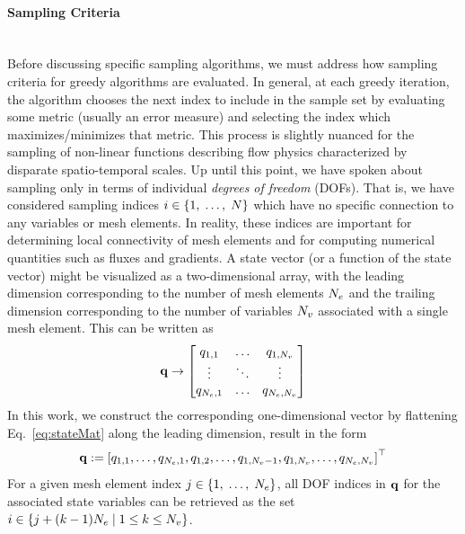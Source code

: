 \paragraph*{Sampling Criteria}\mbox{}\\
%
Before discussing specific sampling algorithms, we must address how sampling criteria for greedy algorithms are evaluated. In general, at each greedy iteration, the algorithm chooses the next index to include in the sample set by evaluating some metric (usually an error measure) and selecting the index which maximizes/minimizes that metric. This process is slightly nuanced for the sampling of non-linear functions describing flow physics characterized by disparate spatio-temporal scales. Up until this point, we have spoken about sampling only in terms of individual \textit{degrees of freedom} (DOFs). That is, we have considered sampling indices $i \in \{1,\; \hdots, \; N\}$ which have no specific connection to any variables or mesh elements. In reality, these indices are important for determining local connectivity of mesh elements and for computing numerical quantities such as fluxes and gradients. A state vector (or a function of the state vector) might be visualized as a two-dimensional array, with the leading dimension corresponding to the number of mesh elements $N_{e}$ and the trailing dimension corresponding to the number of variables $N_{v}$ associated with a single mesh element. This can be written as
%
\begin{equation}\label{eq:stateMat}
	\mathbf{q} \rightarrow
	\begin{bmatrix}
		q_{1,1} & \hdots & q_{1,N_{v}} \\
		\vdots & \ddots & \vdots \\
		q_{N_{e},1} & \hdots & q_{N_{e},N_{v}}
	\end{bmatrix}
\end{equation}
%
In this work, we construct the corresponding one-dimensional vector by flattening Eq.~\ref{eq:stateMat} along the leading dimension, result in the form
%
\begin{equation}
	\mathbf{q} := \left[q_{1,1}, \hdots, q_{N_{e},1},q_{1,2}, \hdots, q_{1,N_{v}-1}, q_{1,N_{v}}, \hdots, q_{N_{e},N_{v}} \right]^\top
\end{equation}
%
For a given mesh element index $j \in \{1,\; \hdots,\; N_{e}\}$, all DOF indices in $\mathbf{q}$ for the associated state variables can be retrieved as the set $i \in \{j + (k-1) N_{e} \; \vert \; 1 \le k \le N_{v} \}$.

